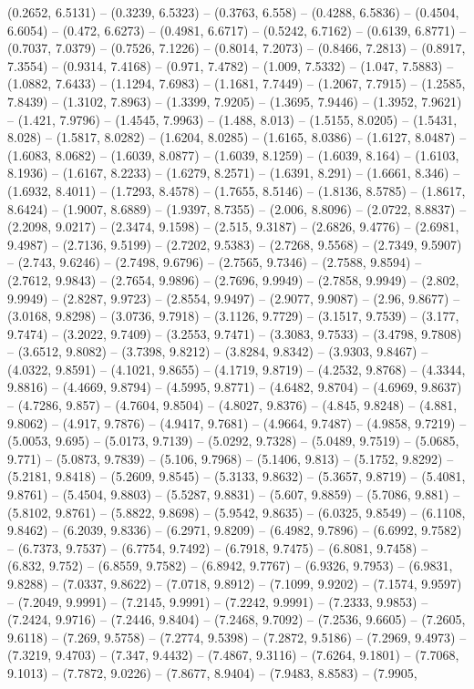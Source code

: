 (0.2652, 6.5131) -- (0.3239, 6.5323) -- (0.3763, 6.558) -- (0.4288, 6.5836) -- (0.4504, 6.6054) -- (0.472, 6.6273) -- (0.4981, 6.6717) -- (0.5242, 6.7162) -- (0.6139, 6.8771) -- (0.7037, 7.0379) -- (0.7526, 7.1226) -- (0.8014, 7.2073) -- (0.8466, 7.2813) -- (0.8917, 7.3554) -- (0.9314, 7.4168) -- (0.971, 7.4782) -- (1.009, 7.5332) -- (1.047, 7.5883) -- (1.0882, 7.6433) -- (1.1294, 7.6983) -- (1.1681, 7.7449) -- (1.2067, 7.7915) -- (1.2585, 7.8439) -- (1.3102, 7.8963) -- (1.3399, 7.9205) -- (1.3695, 7.9446) -- (1.3952, 7.9621) -- (1.421, 7.9796) -- (1.4545, 7.9963) -- (1.488, 8.013) -- (1.5155, 8.0205) -- (1.5431, 8.028) -- (1.5817, 8.0282) -- (1.6204, 8.0285) -- (1.6165, 8.0386) -- (1.6127, 8.0487) -- (1.6083, 8.0682) -- (1.6039, 8.0877) -- (1.6039, 8.1259) -- (1.6039, 8.164) -- (1.6103, 8.1936) -- (1.6167, 8.2233) -- (1.6279, 8.2571) -- (1.6391, 8.291) -- (1.6661, 8.346) -- (1.6932, 8.4011) -- (1.7293, 8.4578) -- (1.7655, 8.5146) -- (1.8136, 8.5785) -- (1.8617, 8.6424) -- (1.9007, 8.6889) -- (1.9397, 8.7355) -- (2.006, 8.8096) -- (2.0722, 8.8837) -- (2.2098, 9.0217) -- (2.3474, 9.1598) -- (2.515, 9.3187) -- (2.6826, 9.4776) -- (2.6981, 9.4987) -- (2.7136, 9.5199) -- (2.7202, 9.5383) -- (2.7268, 9.5568) -- (2.7349, 9.5907) -- (2.743, 9.6246) -- (2.7498, 9.6796) -- (2.7565, 9.7346) -- (2.7588, 9.8594) -- (2.7612, 9.9843) -- (2.7654, 9.9896) -- (2.7696, 9.9949) -- (2.7858, 9.9949) -- (2.802, 9.9949) -- (2.8287, 9.9723) -- (2.8554, 9.9497) -- (2.9077, 9.9087) -- (2.96, 9.8677) -- (3.0168, 9.8298) -- (3.0736, 9.7918) -- (3.1126, 9.7729) -- (3.1517, 9.7539) -- (3.177, 9.7474) -- (3.2022, 9.7409) -- (3.2553, 9.7471) -- (3.3083, 9.7533) -- (3.4798, 9.7808) -- (3.6512, 9.8082) -- (3.7398, 9.8212) -- (3.8284, 9.8342) -- (3.9303, 9.8467) -- (4.0322, 9.8591) -- (4.1021, 9.8655) -- (4.1719, 9.8719) -- (4.2532, 9.8768) -- (4.3344, 9.8816) -- (4.4669, 9.8794) -- (4.5995, 9.8771) -- (4.6482, 9.8704) -- (4.6969, 9.8637) -- (4.7286, 9.857) -- (4.7604, 9.8504) -- (4.8027, 9.8376) -- (4.845, 9.8248) -- (4.881, 9.8062) -- (4.917, 9.7876) -- (4.9417, 9.7681) -- (4.9664, 9.7487) -- (4.9858, 9.7219) -- (5.0053, 9.695) -- (5.0173, 9.7139) -- (5.0292, 9.7328) -- (5.0489, 9.7519) -- (5.0685, 9.771) -- (5.0873, 9.7839) -- (5.106, 9.7968) -- (5.1406, 9.813) -- (5.1752, 9.8292) -- (5.2181, 9.8418) -- (5.2609, 9.8545) -- (5.3133, 9.8632) -- (5.3657, 9.8719) -- (5.4081, 9.8761) -- (5.4504, 9.8803) -- (5.5287, 9.8831) -- (5.607, 9.8859) -- (5.7086, 9.881) -- (5.8102, 9.8761) -- (5.8822, 9.8698) -- (5.9542, 9.8635) -- (6.0325, 9.8549) -- (6.1108, 9.8462) -- (6.2039, 9.8336) -- (6.2971, 9.8209) -- (6.4982, 9.7896) -- (6.6992, 9.7582) -- (6.7373, 9.7537) -- (6.7754, 9.7492) -- (6.7918, 9.7475) -- (6.8081, 9.7458) -- (6.832, 9.752) -- (6.8559, 9.7582) -- (6.8942, 9.7767) -- (6.9326, 9.7953) -- (6.9831, 9.8288) -- (7.0337, 9.8622) -- (7.0718, 9.8912) -- (7.1099, 9.9202) -- (7.1574, 9.9597) -- (7.2049, 9.9991) -- (7.2145, 9.9991) -- (7.2242, 9.9991) -- (7.2333, 9.9853) -- (7.2424, 9.9716) -- (7.2446, 9.8404) -- (7.2468, 9.7092) -- (7.2536, 9.6605) -- (7.2605, 9.6118) -- (7.269, 9.5758) -- (7.2774, 9.5398) -- (7.2872, 9.5186) -- (7.2969, 9.4973) -- (7.3219, 9.4703) -- (7.347, 9.4432) -- (7.4867, 9.3116) -- (7.6264, 9.1801) -- (7.7068, 9.1013) -- (7.7872, 9.0226) -- (7.8677, 8.9404) -- (7.9483, 8.8583) -- (7.9905, 